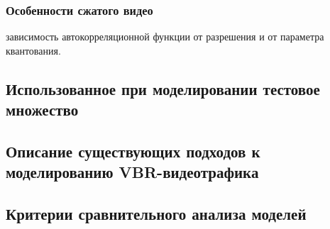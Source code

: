 \subsubsection{Особенности сжатого видео}
\hspace{3pt}

зависимость автокорреляционной функции от разрешения
и от параметра квантования.

\subsection{Использованное при моделировании тестовое множество}

\subsection{Описание существующих подходов к моделированию VBR-видеотрафика}

\subsection{Критерии сравнительного анализа моделей}
